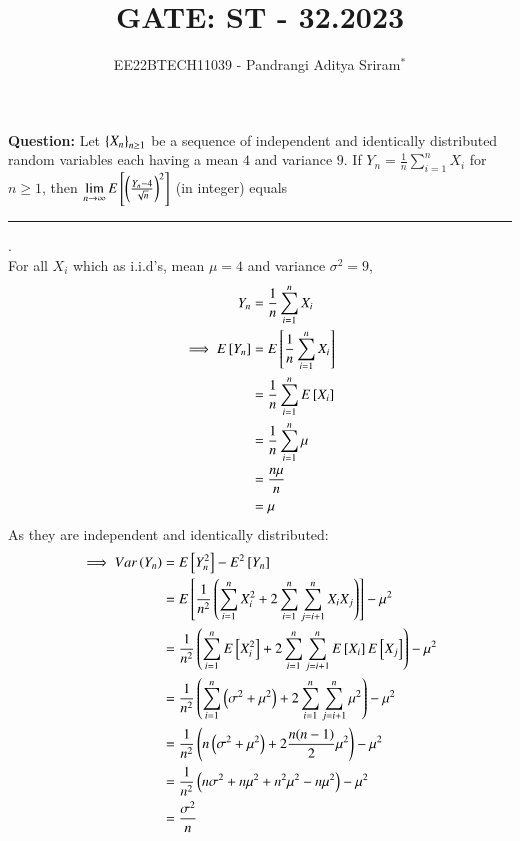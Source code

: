 \documentclass[journal,12pt,onecolumn]{IEEEtran}
\theoremstyle{remark}
\begin{document}

\vspace{3cm}

\title{GATE: ST - 32.2023}
\author{EE22BTECH11039 - Pandrangi Aditya Sriram$^{*}$%
}
\maketitle
\bigskip

\renewcommand{\thefigure}{\theenumi}
\renewcommand{\thetable}{\theenumi}


\vspace{3cm}
\textbf{Question:} Let $\left\{X_n\right\}_{n \geq 1}$ be a sequence of independent and identically distributed random variables each having a mean $4$ and variance $9$. If $Y_n = \frac{1}{n} \sum_{i=1}^{n} X_i$ for $n \geq 1$, then $\lim\limits_{n \to \infty} E{}\left[\left(\frac{Y_n - 4}{\sqrt{n}}\right)^2\right]$ (in integer) equals \rule{2cm}{0.1mm}.
\\
\solution
For all $X_i$ which as i.i.d's, mean $\mu = 4$ and variance $\sigma^2 = 9$,
\begin{align}
    Y_n &= \frac{1}{n} \sum_{i=1}^{n} X_i\\
    \implies E{}\left[Y_n\right] &= E{}\left[\frac{1}{n} \sum_{i=1}^{n} X_i\right]\\
    &= \frac{1}{n} \sum_{i=1}^{n} E{}\left[X_i\right]\\
    &= \frac{1}{n} \sum_{i=1}^{n} \mu\\
    &= \frac{n\mu}{n}\\
    &= \mu
\end{align}
As they are independent and identically distributed:
\begin{align}
    \implies Var\left(Y_n\right) &= E{}\left[Y_n^2\right] - E^2{}\left[Y_n\right]\\
    &= E{}\left[\frac{1}{n^2} \left(\sum_{i=1}^{n} X_i^2 + 2\sum_{i=1}^{n}\sum_{j=i+1}^{n} X_i X_j\right)\right] - \mu^2\\
    &= \frac{1}{n^2} \left(\sum_{i=1}^{n} E{}\left[X_i^2\right] + 2\sum_{i=1}^{n}\sum_{j=i+1}^{n} E{}\left[X_i\right] E{}\left[X_j\right]\right) - \mu^2\\
    &= \frac{1}{n^2} \left(\sum_{i=1}^{n} \left(\sigma^2 + \mu^2\right) + 2\sum_{i=1}^{n}\sum_{j=i+1}^{n} \mu^2\right) - \mu^2\\
    &= \frac{1}{n^2} \left(n\left(\sigma^2 + \mu^2\right) + 2 \frac{n(n-1)}{2} \mu^2\right) - \mu^2\\
    &= \frac{1}{n^2} \left(n\sigma^2 + n\mu^2 + n^2 \mu^2 - n \mu^2\right) - \mu^2\\
    &= \frac{\sigma^2}{n} 
\end{align}
\end{document}
